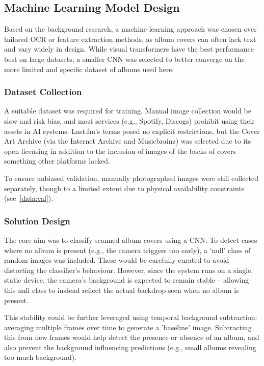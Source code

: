         \subsection{Machine Learning Model Design} \label{sec:mlDesign}
    
            Based on the background research, a machine-learning approach was chosen over tailored OCR or feature extraction methods, as album covers can often lack text and vary widely in design. While visual transformers have the best performance best on large datasets, a smaller CNN was selected to better converge on the more limited and specific dataset of albums used here.
        
            \subsubsection{Dataset Collection}
    
                A suitable dataset was required for training. Manual image collection would be slow and risk bias, and most services (e.g., Spotify, Discogs) prohibit using their assets in AI systems. Last.fm’s terms posed no explicit restrictions, but the Cover Art Archive (via the Internet Archive and Musicbrainz) was selected due to its open licensing in addition to the inclusion of images of the backs of covers -- something other platforms lacked.
    
                To ensure unbiased validation, manually photographed images were still collected separately, though to a limited extent due to physical availability constraints (see~\ref{data:val}).
    
            \subsubsection{Solution Design}
    
                The core aim was to classify scanned album covers using a CNN. To detect cases where no album is present (e.g., the camera triggers too early), a ‘null’ class of random images was included. These would be carefully curated to avoid distorting the classifier’s behaviour. However, since the system runs on a single, static device, the camera’s background is expected to remain stable -- allowing this null class to instead reflect the actual backdrop seen when no album is present.
    
                This stability could be further leveraged using temporal background subtraction: averaging multiple frames over time to generate a 'baseline' image. Subtracting this from new frames would help detect the presence or absence of an album, and also prevent the background influencing predictions (e.g., small albums revealing too much background).
    
